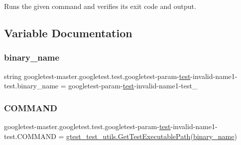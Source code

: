 \begin{DoxyVerb}Runs the given command and verifies its exit code and output.\end{DoxyVerb}
 

\subsection{Variable Documentation}
\mbox{\label{namespacegoogletest-master_1_1googletest_1_1test_1_1googletest-param-test-invalid-name1-test_a96c453764fc603af54ac5e4361cde904}} 
\subsubsection{\texorpdfstring{binary\_name}{binary\_name}}
{\footnotesize\ttfamily string googletest-\/master.\+googletest.\+test.\+googletest-\/param-\/\mbox{\hyperlink{_mutual_8h_a707ee03719e99670bf6cfdfd897b8456}{test}}-\/invalid-\/name1-\/test.\+binary\+\_\+name = \textquotesingle{}googletest-\/param-\/\mbox{\hyperlink{_mutual_8h_a707ee03719e99670bf6cfdfd897b8456}{test}}-\/invalid-\/name1-\/test\+\_\+\textquotesingle{}}

\mbox{\label{namespacegoogletest-master_1_1googletest_1_1test_1_1googletest-param-test-invalid-name1-test_a4e4bcb8d4a33cff12fb8b3b99ce69f5d}} 
\subsubsection{\texorpdfstring{COMMAND}{COMMAND}}
{\footnotesize\ttfamily googletest-\/master.\+googletest.\+test.\+googletest-\/param-\/\mbox{\hyperlink{_mutual_8h_a707ee03719e99670bf6cfdfd897b8456}{test}}-\/invalid-\/name1-\/test.\+C\+O\+M\+M\+A\+ND = \mbox{\hyperlink{namespacegoogletest-master_1_1googletest_1_1test_1_1gtest__test__utils_a78bbc69ac699e750a6a29188caa643c4}{gtest\+\_\+test\+\_\+utils.\+Get\+Test\+Executable\+Path}}(\mbox{\hyperlink{namespacegoogletest-master_1_1googletest_1_1test_1_1googletest-param-test-invalid-name1-test_a96c453764fc603af54ac5e4361cde904}{binary\+\_\+name}})}

